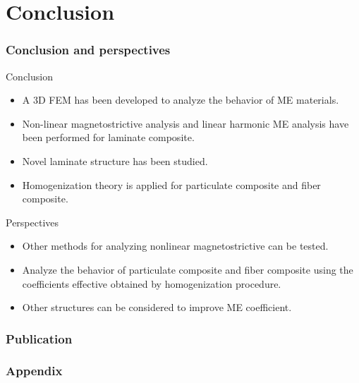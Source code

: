 \documentclass[compress]{beamer}
\begin{document}
\section{Conclusion}
\begin{frame}\frametitle{Conclusion and perspectives}
\begin{block}{Conclusion}
\begin{itemize}[label=$\bullet$, font=\small, leftmargin=*]
\item A 3D FEM has been developed to analyze the behavior of ME materials.
\item Non-linear magnetostrictive analysis  and linear harmonic ME analysis  have been performed for laminate composite. 
\item Novel laminate structure has been studied.
\item Homogenization theory is applied for particulate composite and fiber composite.
\end{itemize}
\end{block}
\begin{exampleblock}{Perspectives}
\begin{itemize} [label=$\bullet$, font=\small, leftmargin=*]
\item Other methods for analyzing nonlinear magnetostrictive can be tested.
\item Analyze the behavior of particulate composite and fiber composite using the coefficients effective obtained by homogenization procedure.
\item Other structures can be considered to improve ME coefficient.
\end{itemize}
\end{exampleblock}
\end{frame}


\begin{frame}\frametitle{Publication}






\end{frame}

\begin{frame}\frametitle{Appendix}

\end{frame}

%        
%        
\end{document}

